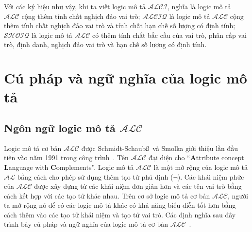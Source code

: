 \documentclass[12pt,a4paper,twoside]{report}
\newcommand{\AL}		{$\mathcal{AL}$\xspace}
\newcommand{\ALC}		{$\mathcal{ALC}$\xspace}
\newcommand{\ALCI}		{$\mathcal{ALCI}$\xspace}
\newcommand{\ALCIQ}		{$\mathcal{ALCIQ}$\xspace}
\newcommand{\SHOIQ}		{$\mathcal{SHOIQ}$\xspace}
\theoremstyle{definition}
\begin{document}
Với các ký hiệu như vậy, khi ta viết logic mô tả \ALCI, nghĩa là logic mô tả \ALC cộng thêm tính chất nghịch đảo vai trò; \ALCIQ là logic mô tả \ALC cộng thêm tính chất nghịch đảo vai trò và tính chất hạn chế số lượng có định tính; \SHOIQ là logic mô tả \ALC có thêm tính chất bắc cầu của vai trò, phân cấp vai trò, định danh, nghịch đảo vai trò và hạn chế số lượng có định tính.
\section{Cú pháp và ngữ nghĩa của logic mô tả}

\subsection{Ngôn ngữ logic mô tả \ALC}

Logic mô tả cơ bản \ALC được Schmidt-Schaub\ss\ và Smolka giới thiệu lần đầu tiên vào năm 1991 trong công trình~\cite{Schmidt1991}. Tên \ALC đại diện cho ``\textbf{A}ttribute concept \textbf{L}anguage with \textbf{C}omplements''. Logic mô tả \ALC là một mở rộng của logic mô tả \AL bằng cách cho phép sử dụng thêm tạo tử phủ định ($\neg$). 
%
Các khái niệm phức của \ALC được xây dựng từ các khái niệm đơn giản hơn và các tên vai trò bằng cách kết hợp với các tạo tử khác nhau. Trên cơ sở logic mô tả cơ bản \ALC, người ta mở rộng nó để có các logic mô tả khác có khả năng biểu diễn tốt hơn bằng cách thêm vào các tạo tử khái niệm và tạo tử vai trò.
Các định nghĩa sau đây trình bày cú pháp và ngữ nghĩa của logic mô tả cơ bản \ALC~\cite{Lehmann2006,Lehmann2010}.
\end{document}

